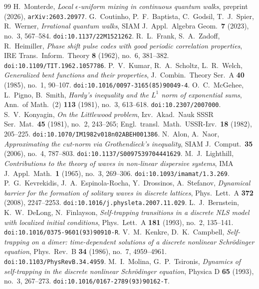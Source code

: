 \documentclass[11pt,reqno]{amsart}
\theoremstyle{plain}
\theoremstyle{definition}
\begin{document}
\begin{thebibliography}{99}
 H.~Monterde, \emph{Local $\epsilon$-uniform mixing in continuous quantum walks}, preprint (2026), \texttt{arXiv:2603.20977}.
 G.~Coutinho, P.~F.~Baptista, C.~Godsil, T.~J.~Spier, R.~Werner, \emph{Irrational quantum walks}, SIAM J.\ Appl.\ Algebra Geom.\ \textbf{7} (2023), no.~3, 567--584. \texttt{doi:10.1137/22M1521262}.
 R.~L.~Frank, S.~A.~Zadoff, R.~Heimiller, \emph{Phase shift pulse codes with good periodic correlation properties}, IRE Trans.\ Inform.\ Theory \textbf{8} (1962), no.~6, 381--382. \texttt{doi:10.1109/TIT.1962.1057786}.
 P.~V.~Kumar, R.~A.~Scholtz, L.~R.~Welch, \emph{Generalized bent functions and their properties}, J.\ Combin.\ Theory Ser.~A \textbf{40} (1985), no.~1, 90--107. \texttt{doi:10.1016/0097-3165(85)90049-4}.
 O.~C.~McGehee, L.~Pigno, B.~Smith, \emph{Hardy's inequality and the $L^1$ norm of exponential sums}, Ann.\ of Math.\ (2) \textbf{113} (1981), no.~3, 613--618. \texttt{doi:10.2307/2007000}.
 S.~V.~Konyagin, \emph{On the Littlewood problem}, Izv.\ Akad.\ Nauk SSSR Ser.\ Mat.\ \textbf{45} (1981), no.~2, 243--265; Engl.\ transl.\ Math.\ USSR-Izv.\ \textbf{18} (1982), 205--225. \texttt{doi:10.1070/IM1982v018n02ABEH001386}.
 N.~Alon, A.~Naor, \emph{Approximating the cut-norm via Grothendieck's inequality}, SIAM J.\ Comput.\ \textbf{35} (2006), no.~4, 787--803. \texttt{doi:10.1137/S0097539704441629}.
 M.~J.~Lighthill, \emph{Contributions to the theory of waves in non-linear dispersive systems}, IMA J.\ Appl.\ Math.\ \textbf{1} (1965), no.~3, 269--306. \texttt{doi:10.1093/imamat/1.3.269}.
 P.~G.~Kevrekidis, J.~A.~Espinola-Rocha, Y.~Drossinos, A.~Stefanov, \emph{Dynamical barrier for the formation of solitary waves in discrete lattices}, Phys.\ Lett.\ A \textbf{372} (2008), 2247--2253. \texttt{doi:10.1016/j.physleta.2007.11.029}.
 L.~J.~Bernstein, K.~W.~DeLong, N.~Finlayson, \emph{Self-trapping transitions in a discrete NLS model with localized initial conditions}, Phys.\ Lett.\ A \textbf{181} (1993), no.~2, 135--141. \texttt{doi:10.1016/0375-9601(93)90910-R}.
 V.~M.~Kenkre, D.~K.~Campbell, \emph{Self-trapping on a dimer: time-dependent solutions of a discrete nonlinear Schr\"odinger equation}, Phys.\ Rev.\ B \textbf{34} (1986), no.~7, 4959--4961. \texttt{doi:10.1103/PhysRevB.34.4959}.
 M.~I.~Molina, G.~P.~Tsironis, \emph{Dynamics of self-trapping in the discrete nonlinear Schr\"odinger equation}, Physica D \textbf{65} (1993), no.~3, 267--273. \texttt{doi:10.1016/0167-2789(93)90162-T}.

\end{thebibliography}
\end{document}
